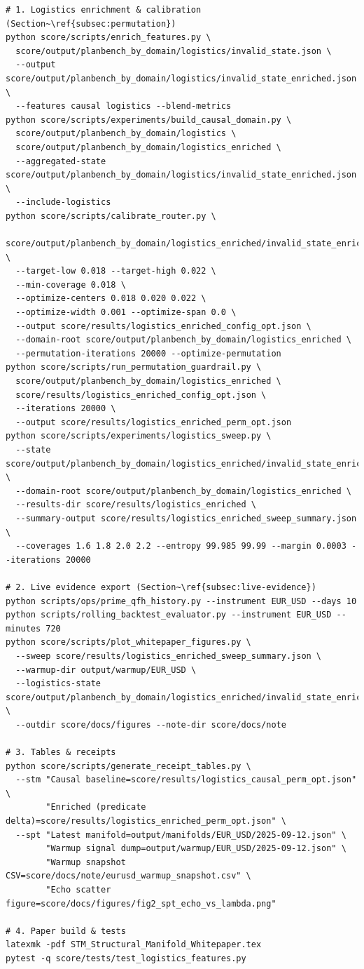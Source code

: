 \documentclass[11pt]{article}
\begin{document}
\begin{lstlisting}[style=stm]
# 1. Logistics enrichment & calibration (Section~\ref{subsec:permutation})
python score/scripts/enrich_features.py \
  score/output/planbench_by_domain/logistics/invalid_state.json \
  --output score/output/planbench_by_domain/logistics/invalid_state_enriched.json \
  --features causal logistics --blend-metrics
python score/scripts/experiments/build_causal_domain.py \
  score/output/planbench_by_domain/logistics \
  score/output/planbench_by_domain/logistics_enriched \
  --aggregated-state score/output/planbench_by_domain/logistics/invalid_state_enriched.json \
  --include-logistics
python score/scripts/calibrate_router.py \
  score/output/planbench_by_domain/logistics_enriched/invalid_state_enriched.json \
  --target-low 0.018 --target-high 0.022 \
  --min-coverage 0.018 \
  --optimize-centers 0.018 0.020 0.022 \
  --optimize-width 0.001 --optimize-span 0.0 \
  --output score/results/logistics_enriched_config_opt.json \
  --domain-root score/output/planbench_by_domain/logistics_enriched \
  --permutation-iterations 20000 --optimize-permutation
python score/scripts/run_permutation_guardrail.py \
  score/output/planbench_by_domain/logistics_enriched \
  score/results/logistics_enriched_config_opt.json \
  --iterations 20000 \
  --output score/results/logistics_enriched_perm_opt.json
python score/scripts/experiments/logistics_sweep.py \
  --state score/output/planbench_by_domain/logistics_enriched/invalid_state_enriched.json \
  --domain-root score/output/planbench_by_domain/logistics_enriched \
  --results-dir score/results/logistics_enriched \
  --summary-output score/results/logistics_enriched_sweep_summary.json \
  --coverages 1.6 1.8 2.0 2.2 --entropy 99.985 99.99 --margin 0.0003 --iterations 20000

# 2. Live evidence export (Section~\ref{subsec:live-evidence})
python scripts/ops/prime_qfh_history.py --instrument EUR_USD --days 10
python scripts/rolling_backtest_evaluator.py --instrument EUR_USD --minutes 720
python score/scripts/plot_whitepaper_figures.py \
  --sweep score/results/logistics_enriched_sweep_summary.json \
  --warmup-dir output/warmup/EUR_USD \
  --logistics-state score/output/planbench_by_domain/logistics_enriched/invalid_state_enriched.json \
  --outdir score/docs/figures --note-dir score/docs/note

# 3. Tables & receipts
python score/scripts/generate_receipt_tables.py \
  --stm "Causal baseline=score/results/logistics_causal_perm_opt.json" \
        "Enriched (predicate delta)=score/results/logistics_enriched_perm_opt.json" \
  --spt "Latest manifold=output/manifolds/EUR_USD/2025-09-12.json" \
        "Warmup signal dump=output/warmup/EUR_USD/2025-09-12.json" \
        "Warmup snapshot CSV=score/docs/note/eurusd_warmup_snapshot.csv" \
        "Echo scatter figure=score/docs/figures/fig2_spt_echo_vs_lambda.png"

# 4. Paper build & tests
latexmk -pdf STM_Structural_Manifold_Whitepaper.tex
pytest -q score/tests/test_logistics_features.py
\end{lstlisting}
\end{document}

